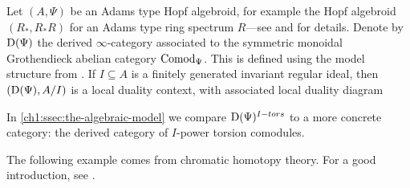 \begin{example}
    \label{ch1:ex:local-duality-comod}
    Let $(A,\Psi)$ be an Adams type Hopf algebroid, for example the Hopf algebroid $(R_*, R_*R)$ for an Adams type ring spectrum $R$---see \cite[A.1]{ravenel_86} and \cite{hovey_04} for details. Denote by $\mathrm{D}(\Psi)$ the derived $\infty$-category associated to the symmetric monoidal Grothendieck abelian category $\mathrm{Comod}_\Psi$. This is defined using the model structure from \cite{barnes-roitzheim_2011}. If $I\subseteq A$ is a finitely generated invariant regular ideal, then $(\mathrm{D}(\Psi), A/I)$ is a local duality context, with associated local duality diagram
    \begin{center}
    \end{center}
\end{example}

In \cref{ch1:ssec:the-algebraic-model} we compare $\mathrm{D}(\Psi)^{I-tors}$ to a more concrete category: the derived category of $I$-power torsion comodules.  

The following example comes from chromatic homotopy theory. For a good introduction, see \cite{barthel-beaudry_19}. 

